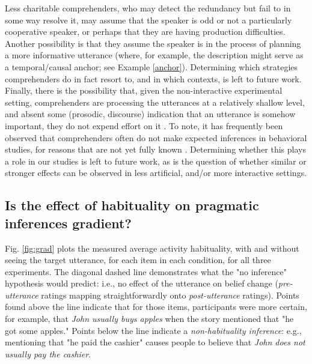 \documentclass{sp}\usepackage[]{graphicx}\usepackage[]{color}
\begin{document}
Less charitable comprehenders, who may detect the redundancy but fail to in some way resolve it, may assume that the speaker is odd or not a particularly cooperative speaker, or perhaps that they are having production difficulties.  Another possibility is that they assume the speaker is in the process of planning a more informative utterance (where, for example, the description might serve as a temporal/causal anchor; see Example \ref{anchor}). Determining which strategies comprehenders do in fact resort to, and in which contexts, is left to future work. Finally, there is the possibility that, given the non-interactive experimental setting, comprehenders are processing the utterances at a relatively shallow level, and absent some (prosodic, discourse) indication that an utterance is somehow important, they do not expend effort on it \citep{Sanford2006}. To note, it has frequently been observed that comprehenders often do not make expected inferences in behavioral studies, for reasons that are not yet fully known \citep[cf.,][]{Noveck2003}. Determining whether this plays a role in our studies is left to future work, as is the question of whether similar or stronger effects can be observed in less artificial, and/or more interactive settings.

\subsection{Is the effect of habituality on pragmatic inferences gradient?}

Fig. \ref{fig:grad} plots the measured average activity habituality, with and without seeing the target utterance, for each item in each condition, for all three experiments. The diagonal dashed line demonstrates what the "no inference" hypothesis would predict: i.e., no effect of the utterance on belief change (\textit{pre-utterance} ratings mapping straightforwardly onto \textit{post-utterance} ratings). Points found above the line indicate that for those items, participants were more certain, for example, that \textit{John usually buys apples} when the story mentioned that "he got some apples." Points below the line indicate a \textit{non-habituality inference}: e.g., mentioning that "he paid the cashier" causes people to believe that \textit{John does not usually pay the cashier}.
\end{document}
